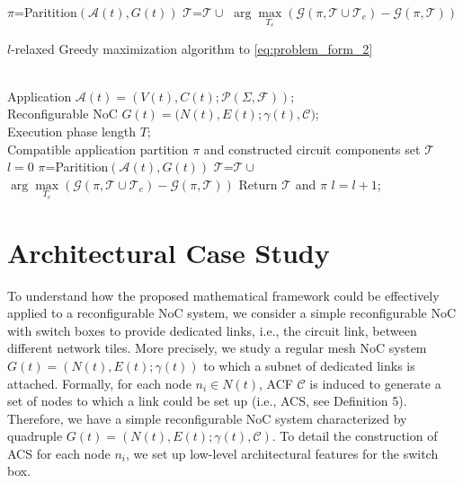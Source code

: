 {{\begin{algorithm}[t]
\begin{algorithmic}[1]
\STATE $\pi$=Paritition$(\mathcal A(t),G(t))$
\REPEAT
\STATE $\mathcal T$=$\mathcal T \cup$ $\arg\max\limits_{T_{e}} (\mathcal G(\pi,\mathcal T \cup \mathcal T_e)- \mathcal G(\pi,\mathcal T))$
\end{algorithmic}
\end{algorithm}
\begin{algorithm}[t]
\caption{ $l$-relaxed Greedy maximization algorithm to \eqref{eq:problem_form_2}}
\label{alg:max_2}
\begin{algorithmic}[1]
\REQUIRE ~~\\
    Application  $\mathcal A(t)=(V(t),C(t);\mathcal P(\Sigma,\mathcal F))$; \\
    Reconfigurable NoC $G(t)=(N(t),E(t);\gamma(t),$$\mathcal C)$;\\
    Execution phase length $T$;
    \ENSURE ~~\\
    Compatible application partition $\pi$ and constructed circuit components set $\mathcal T$
\STATE $l=0$    
\STATE $\pi$=Paritition$(\mathcal A(t),G(t))$
\REPEAT
\REPEAT
\STATE $\mathcal T$=$\mathcal T \cup$ $\arg\max\limits_{T_{e}} (\mathcal G(\pi,\mathcal T \cup \mathcal T_e)- \mathcal G(\pi,\mathcal T))$
\STATE Return $\mathcal T$ and $\pi$
\ENDIF
\STATE $l=l+1$;
\end{algorithmic}
\end{algorithm}

\section{Architectural Case Study}
To understand how the proposed mathematical framework could be effectively applied to a reconfigurable NoC system, we consider a simple reconfigurable NoC with switch boxes to provide dedicated links, i.e., the circuit link, between different network tiles. More precisely, we study a regular mesh NoC system $G(t)=(N(t),E(t);\gamma(t))$ to which a subnet of dedicated links is attached. Formally, for each node $n_i \in N(t)$, ACF $\mathcal C$ is induced to generate a set of nodes to which a link could be set up (i.e., ACS, see Definition 5). Therefore, we have a simple reconfigurable NoC system characterized by quadruple $G(t)=(N(t),E(t);\gamma(t), \mathcal C)$. To detail the construction of ACS for each node $n_i$, we set up low-level architectural features for the switch box.

}}
